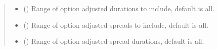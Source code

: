 \documentclass[letterpaper,10pt,english]{report}
\begin{document}
\begin{fulllineitems}
\begin{fulllineitems}
\begin{quote}
\begin{description}
\begin{itemize}
\item {} 
 (\sphinxstyleliteralemphasis{\sphinxupquote{{[}}}\sphinxstyleliteralemphasis{\sphinxupquote{, }}\sphinxstyleliteralemphasis{\sphinxupquote{{]}}}\sphinxstyleliteralemphasis{\sphinxupquote{, }}\sphinxstyleliteralemphasis{\sphinxupquote{(}}\sphinxstyleliteralemphasis{\sphinxupquote{, }}\sphinxstyleliteralemphasis{\sphinxupquote{)}}\sphinxstyleliteralemphasis{\sphinxupquote{}}) \textendash{} Range of option adjusted durations to include, default is all.

\item {} 
 (\sphinxstyleliteralemphasis{\sphinxupquote{{[}}}\sphinxstyleliteralemphasis{\sphinxupquote{, }}\sphinxstyleliteralemphasis{\sphinxupquote{{]}}}\sphinxstyleliteralemphasis{\sphinxupquote{, }}\sphinxstyleliteralemphasis{\sphinxupquote{(}}\sphinxstyleliteralemphasis{\sphinxupquote{, }}\sphinxstyleliteralemphasis{\sphinxupquote{)}}\sphinxstyleliteralemphasis{\sphinxupquote{}}) \textendash{} Range of option adjusted spreads to include, default is all.

\item {} 
 (\sphinxstyleliteralemphasis{\sphinxupquote{{[}}}\sphinxstyleliteralemphasis{\sphinxupquote{, }}\sphinxstyleliteralemphasis{\sphinxupquote{{]}}}\sphinxstyleliteralemphasis{\sphinxupquote{, }}\sphinxstyleliteralemphasis{\sphinxupquote{(}}\sphinxstyleliteralemphasis{\sphinxupquote{, }}\sphinxstyleliteralemphasis{\sphinxupquote{)}}\sphinxstyleliteralemphasis{\sphinxupquote{}}) \textendash{} Range of option adjusted spread durations, default is all.


\end{itemize}
\end{description}
\end{quote}
\end{fulllineitems}
\end{fulllineitems}
\end{document}
